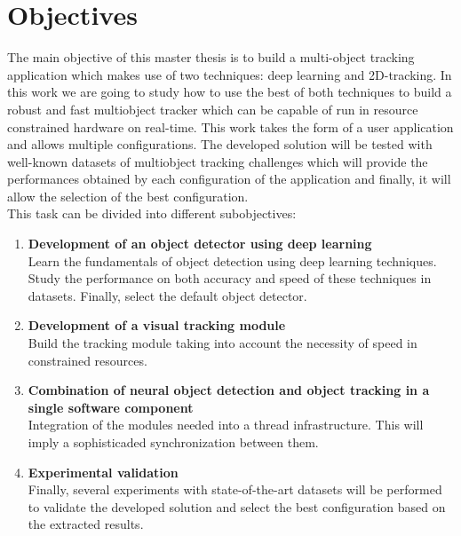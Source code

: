 \section{Objectives}
The main objective of this master thesis is to build a multi-object tracking application which makes use of two techniques: deep learning and 2D-tracking. In this work we are going to study how to use the best of both techniques to build a robust and fast multiobject tracker which can be capable of run in resource constrained hardware on real-time. This work takes the form of a user application and allows multiple configurations. The developed solution will be tested with well-known datasets of multiobject tracking challenges which will provide the performances obtained by each configuration of the application and finally, it will allow the selection of the best configuration.\\
This task can be divided into different subobjectives:
\begin{enumerate}
\item \textbf{Development of an object detector using deep learning}\\\label{first_objective}
Learn the fundamentals of object detection using deep learning techniques. Study the performance on both accuracy and speed of these techniques in datasets. Finally, select the default object detector.
\item \textbf{Development of a visual tracking module}\\
Build the tracking module taking into account the necessity of speed in constrained resources.
\item \textbf{Combination of neural object detection and object tracking in a single software component}\\
Integration of the modules needed into a thread infrastructure. This will imply a sophisticaded synchronization between them.
\item \textbf{Experimental validation}\\
Finally, several experiments with state-of-the-art datasets will be performed to validate the developed solution and select the best configuration based on the extracted results.
\\ \ \\
\end{enumerate}


